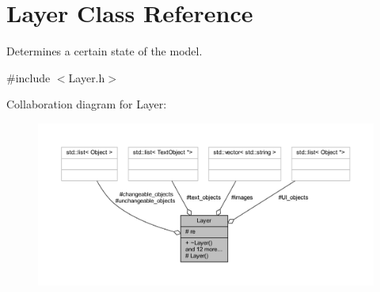 \hypertarget{class_layer}{}\section{Layer Class Reference}
\label{class_layer}


Determines a certain state of the model.  




{\ttfamily \#include $<$Layer.\+h$>$}



Collaboration diagram for Layer\+:\nopagebreak
\begin{figure}[H]
\begin{center}
\leavevmode
\includegraphics[width=350pt]{class_layer__coll__graph}
\end{center}
\end{figure}

